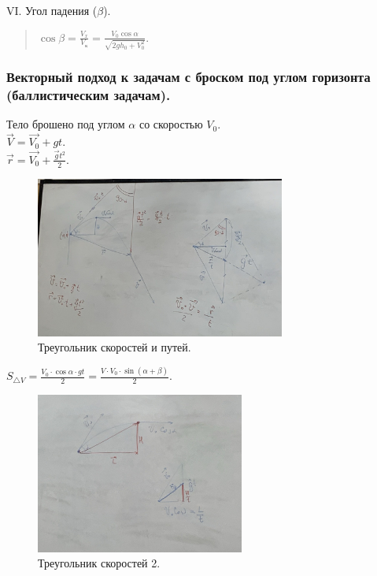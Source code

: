 \documentclass{article}
\begin{document}
	VI. Угол падения ($\beta$).
	\begin{quote}
		$\cos\beta = \frac{V_x}{V_{\text{к}}} = \frac{V_0 \cos\alpha}{\sqrt{2gh_0 + V_0^2}}$.
	\end{quote}
	\subsubsection{Векторный подход к задачам с броском под углом горизонта (баллистическим задачам).}
	Тело брошено под углом $\alpha$ со скоростью $V_0$. \\
	$\vec{V} = \vec{V_0} + gt$. \\
	$\vec{r} = \vec{V_0} + \frac{\vec{g}t^2}{2}$.
	\begin{figure}[H]
		\includegraphics[height=200px]{extra-materials/Скорости_Вектора_1}
		\caption{Треугольник скоростей и путей.}
	\end{figure}
	$S_{\triangle V} = \frac{V_0 \cdot \cos\alpha \cdot gt}{2} = \frac{V \cdot V_0 \cdot \sin(\alpha + \beta)}{2}$.
	\begin{figure}[H]
		\includegraphics[height=200px]{extra-materials/Скорости_Вектора_2}
		\caption{Треугольник скоростей 2.}
	\end{figure}
\end{document}
